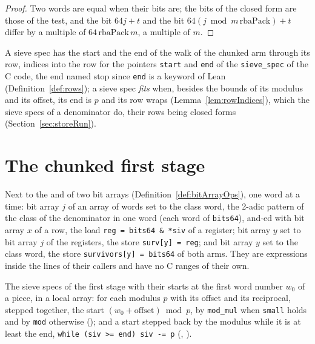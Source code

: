 \begin{proof}
  \leanok
  Two words are equal when their bits are; the bits of the closed form are those of the test, and
  the bit $64 j + t$ and the bit $64 (j \bmod m\,\mathrm{rbaPack}) + t$ differ by a multiple of
  $64\,\mathrm{rbaPack}\, m$, a multiple of $m$.
\end{proof}

A sieve spec has the start and the end of the walk of the chunked arm through its row, indices into
the row for the pointers \verb|start| and \verb|end| of the \verb|sieve_spec| of the C code, the end
named $\mathrm{stop}$ since \verb|end| is a keyword of Lean (Definition~\ref{def:rows}); a sieve
spec \emph{fits} when, besides the bounds of its modulus and its offset, its end is $p$ and its row
wraps (Lemma~\ref{lem:rowIndices}), which the sieve specs of a denominator do, their rows being
closed forms (Section~\ref{sec:storeRun}).

\section{The chunked first stage}\label{sec:chunked}

\begin{definition}\label{def:bitArrayMoves}
  \leanok
  Next to the and of two bit arrays (Definition~\ref{def:bitArrayOps}), one word at a time: bit
  array $j$ of an array of words set to the class word, the 2-adic pattern of the class of the
  denominator in one word (each word of \verb|bits64|), and-ed with bit array $x$ of a row, the load
  \verb|reg = bits64 & *siv| of a register; bit array $y$ set to bit array $j$ of the registers, the
  store \verb|surv[y] = reg|; and bit array $y$ set to the class word, the store
  \verb|survivors[y] = bits64| of both arms. They are expressions inside the lines of their callers
  and have no C ranges of their own.
\end{definition}

\begin{definition}\label{def:chunkStarts}
  \leanok
  The sieve specs of the first stage with their starts at the first word number $w_0$ of a piece, in
  a local array: for each modulus $p$ with its offset and its reciprocal, stepped together, the
  start $(w_0 + \mathrm{offset}) \bmod p$, by \verb|mod_mul| when \verb|small| holds and by
  \verb|mod| otherwise (); and a start stepped back by the modulus while
  it is at least the end, \verb|while (siv >= end) siv -= p| (,
  ).
\end{definition}

